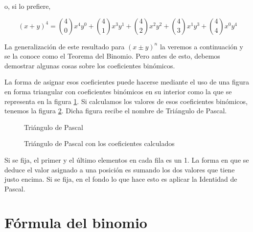 \noindent o, si lo prefiere,

$$ (x + y)^4 = {4 \choose 0} x^4 y^0 + {4 \choose 1} x^3 y^1 + {4 \choose 2}
x^2 y^2 + {4 \choose 3} x^1 y^3 + {4 \choose 4} x^0 y^4 $$

La generalización de este resultado para $(x \pm y)^n$ la veremos a
continuación y se la conoce como el Teorema del Binomio. Pero antes de esto,
debemos demostrar algunas cosas sobre los coeficientes binómicos.

La forma de asignar esos coeficientes puede hacerse mediante el uso de una
figura en forma triangular con coeficientes binómicos en su interior como la
que se representa en la figura \ref{fig-triangulo-pascal-1}. Si calculamos
los valores de esos coeficientes binómicos, tenemos la figura
\ref{fig-triangulo-pascal-2}. Dicha figura recibe el nombre de Triángulo de
Pascal.

\begin{figure}
  \centering
  \label{fig-triangulo-pascal-1}%
  \caption{Triángulo de Pascal}
\end{figure}

\begin{figure}
  \centering
  \label{fig-triangulo-pascal-2}%
  \caption{Triángulo de Pascal con los coeficientes calculados}
\end{figure}

Si se fija, el primer y el último elementos en cada fila es un 1. La forma
en que se deduce el valor asignado a una posición es sumando los dos valores
que tiene justo encima. Si se fija, en el fondo lo que hace esto es aplicar
la Identidad de Pascal.





\section{Fórmula del binomio}

